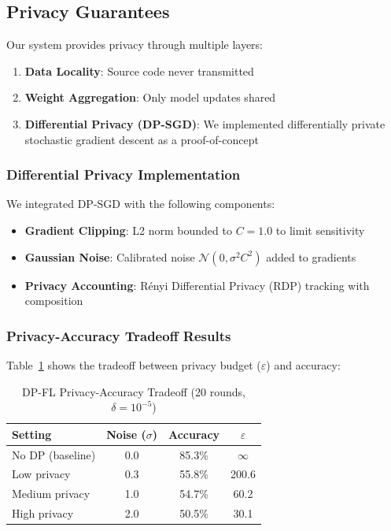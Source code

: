 \documentclass[conference]{IEEEtran}
\begin{document}
\subsection{Privacy Guarantees}

Our system provides privacy through multiple layers:

\begin{enumerate}
    \item \textbf{Data Locality}: Source code never transmitted
    \item \textbf{Weight Aggregation}: Only model updates shared
    \item \textbf{Differential Privacy (DP-SGD)}: We implemented differentially private stochastic gradient descent as a proof-of-concept
\end{enumerate}

\subsubsection{Differential Privacy Implementation}

We integrated DP-SGD with the following components:

\begin{itemize}
    \item \textbf{Gradient Clipping}: L2 norm bounded to $C = 1.0$ to limit sensitivity
    \item \textbf{Gaussian Noise}: Calibrated noise $\mathcal{N}(0, \sigma^2 C^2)$ added to gradients
    \item \textbf{Privacy Accounting}: R\'enyi Differential Privacy (RDP) tracking with composition
\end{itemize}

\subsubsection{Privacy-Accuracy Tradeoff Results}

Table~\ref{tab:dp_results} shows the tradeoff between privacy budget ($\varepsilon$) and accuracy:

\begin{table}[h]
\centering
\caption{DP-FL Privacy-Accuracy Tradeoff (20 rounds, $\delta = 10^{-5}$)}
\label{tab:dp_results}
\begin{tabular}{lccc}
\hline
\textbf{Setting} & \textbf{Noise ($\sigma$)} & \textbf{Accuracy} & \textbf{$\varepsilon$} \\
\hline
No DP (baseline) & 0.0 & 85.3\% & $\infty$ \\
Low privacy & 0.3 & 55.8\% & 200.6 \\
Medium privacy & 1.0 & 54.7\% & 60.2 \\
High privacy & 2.0 & 50.5\% & 30.1 \\
\hline
\end{tabular}
\end{table}
\end{document}
